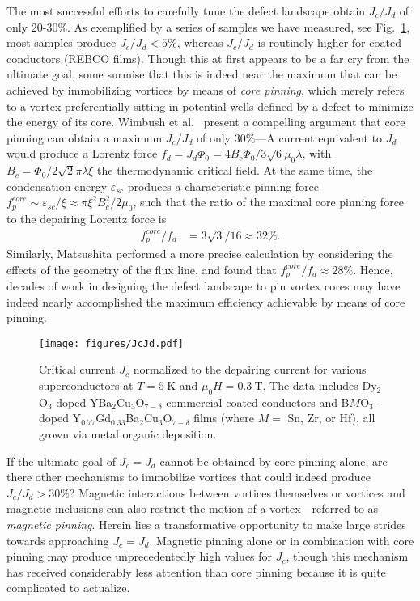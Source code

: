 \documentclass[%
 aip,
 amsmath,amssymb,
 reprint,%
floatfix]{revtex4-1}
\newcommand{\Jc}{J_{c}}
\newcommand{\Jdp}{J_{d}}
\newcommand{\Hc}{B_{c}}
\begin{document}
The most successful efforts to carefully tune the defect landscape obtain $\Jc/\Jdp$ of only 20-30\%.\cite{Civale10201, Selvamanickam_2015} As exemplified by a series of samples we have measured, see Fig.~\ref{fig:JcJd}, most samples produce $\Jc / \Jdp < 5\%$, whereas $\Jc / \Jdp$ is routinely higher for coated conductors (REBCO films).  Though this at first appears to be a far cry from the ultimate goal, some surmise that this is indeed near the maximum that can be achieved by immobilizing vortices by means of \textit{core pinning}, which merely refers to a vortex preferentially sitting in potential wells defined by a defect to minimize the energy of its core.  Wimbush et al.\ \cite{Wimbush2015} present a compelling argument that core pinning can obtain a maximum $\Jc/\Jdp$ of only $30 \%$---A current equivalent to $\Jdp$ would produce a Lorentz force $f_d = \Jdp \Phi_0 = 4 \Hc \Phi_0 / 3 \sqrt{6}\mu_0 \lambda$, with $\Hc =\Phi_0/2\sqrt{2} \pi \lambda \xi$ the thermodynamic critical field. At the same time, the condensation energy $\varepsilon_{sc}$ produces a characteristic pinning force $f_p^{core} \sim \varepsilon_{sc}/\xi \approx \pi \xi^2 \Hc^2 / 2\mu_0$, such that the ratio of the maximal core pinning force to the depairing Lorentz force is
%
\begin{align}
    f_p^{core} / f_d &= 3 \sqrt{3} / 16 \approx 32 \%.
\end{align}
%
Similarly, Matsushita \cite{matsushita2007} performed a more precise calculation by considering the effects of the geometry of the flux line, and found that $f_p^{core}/f_d \approx 28 \%$.  Hence, decades of work in designing the defect landscape to pin vortex cores may have indeed nearly accomplished the maximum efficiency achievable by means of core pinning.  






\begin{figure}
\centering
\texttt{[image: figures/JcJd.pdf]}
\caption{\label{fig:JcJd} Critical current $\Jc$ normalized to the depairing current for various superconductors at $T=\SI{5}{\kelvin}$ and $\mu_0 H = \SI{0.3}{\tesla}$.  The data includes Dy$_2$O$_3$-doped YBa$_2$Cu$_3$O$_{7-\delta}$ commercial coated conductors and B$M$O$_3$-doped Y$_{0.77}$Gd$_{0.33}$Ba$_2$Cu$_3$O$_{7-\delta}$ films (where $M =$ Sn, Zr, or Hf), all grown via metal organic deposition.}
\end{figure}


If the ultimate goal of $\Jc = \Jdp$ cannot be obtained by core pinning alone, are there other mechanisms to immobilize vortices that could indeed produce $\Jc/\Jdp > 30 \%$? Magnetic interactions between vortices themselves or vortices and magnetic inclusions can also restrict the motion of a vortex---referred to as \textit{magnetic pinning}. Herein lies a transformative opportunity to make large strides towards approaching $\Jc = \Jdp$. Magnetic pinning alone or in combination with core pinning may produce unprecedentedly high values for $\Jc$, though this mechanism has received considerably less attention than core pinning because it is quite complicated to actualize.
\end{document}
